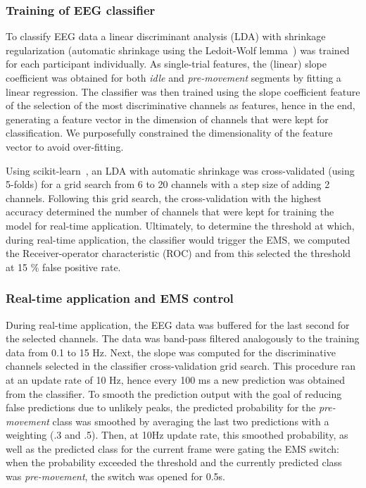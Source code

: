 \subsubsection{Training of EEG classifier}
To classify EEG data a linear discriminant analysis (LDA) with shrinkage regularization (automatic shrinkage using the Ledoit-Wolf lemma~\cite{Ledoit2004-bi}) was trained for each participant individually. As single-trial features, the (linear) slope coefficient was obtained for both \textit{idle} and \textit{pre-movement} segments by fitting a linear regression. The classifier was then trained using the slope coefficient feature of the selection of the most discriminative channels as features, hence in the end, generating a feature vector in the dimension of channels that were kept for classification. We purposefully constrained the dimensionality of the feature vector to avoid over-fitting. 

Using scikit-learn~\cite{Pedregosa2012-sj}, an LDA with automatic shrinkage was cross-validated (using 5-folds) for a grid search from 6 to 20 channels with a step size of adding 2 channels. Following this grid search, the cross-validation with the highest accuracy determined the number of channels that were kept for training the model for real-time application. Ultimately, to determine the threshold at which, during real-time application, the classifier would trigger the EMS, we computed the Receiver-operator characteristic (ROC) and from this selected the threshold at 15 \% false positive rate.

\subsubsection{Real-time application and EMS control}
During real-time application, the EEG data was buffered for the last second for the selected channels. The data was band-pass filtered analogously to the training data from 0.1 to 15 Hz. Next, the slope was computed for the discriminative channels selected in the classifier cross-validation grid search. This procedure ran at an update rate of 10 Hz, hence every 100 ms a new prediction was obtained from the classifier. To smooth the prediction output with the goal of reducing false predictions due to unlikely peaks, the predicted probability for the \textit{pre-movement} class was smoothed by averaging the last two predictions with a weighting (.3 and .5). Then, at 10Hz update rate, this smoothed probability, as well as the predicted class for the current frame were gating the EMS switch: when the probability exceeded the threshold and the currently predicted class was \textit{pre-movement}, the switch was opened for 0.5s.

